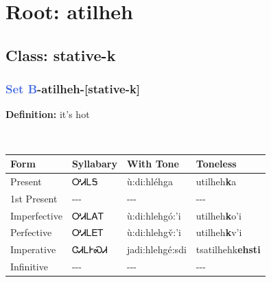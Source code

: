 \needspace{4in}
\section*{Root: atilheh}
\nopagebreak
{}
\needspace{3in}
\subsection*{Class: stative-k}
\nopagebreak
\needspace{2in}
\subsubsection*{\textcolor{RoyalBlue}{Set B}{-}\textbf{atilheh}{-}[stative-k]}
\nopagebreak
\textbf{Definition: } it{\textquoteright}s hot
\\[0.5em]
\begin{tabularx}{\textwidth}{l X X X}%
\toprule%
\textbf{Form}&\textbf{Syllabary}&\textbf{With Tone}&\textbf{Toneless}\\%
\midrule%
Present&ᎤᏗᏞᎦ&ù:di:hléhga&utilheh\textbf{k}a\\%
1st Present&{-}{-}{-}&{-}{-}{-}&{-}{-}{-}\\%
Imperfective&ᎤᏗᏞᎪᎢ&ù:di:hlehgó:’i&utilheh\textbf{k}o'i\\%
Perfective&ᎤᏗᏞᎬᎢ&ù:di:hlehgv̌:’i&utilheh\textbf{k}v'i\\%
Imperative&ᏣᏗᏞᎨᏍᏗ&jadi:hlehgé:sdi&tsatilhehk\textbf{ehsti}\\%
Infinitive&{-}{-}{-}&{-}{-}{-}&{-}{-}{-}\\%
\bottomrule%
\end{tabularx}
\\[1em]